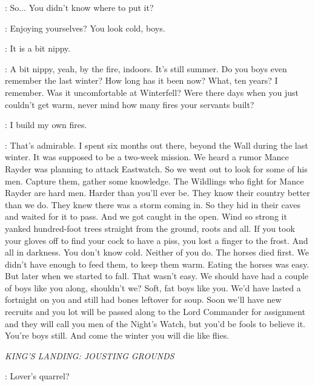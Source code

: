 \SAM: So$\ldots$ You didn't know where to put it? 


\ALLISER: Enjoying yourselves? You look cold, boys. 

\SAM: It is a bit nippy. 

\ALLISER: A bit nippy, yeah, by the fire, indoors. It's still summer. Do you boys even remember the last winter? How long has it been now? What, ten years? I remember. Was it uncomfortable at Winterfell? Were there days when you just couldn't get warm, never mind how many fires your servants built? 

\JON: I build my own fires. 

\ALLISER: That's admirable. I spent six months out there, beyond the Wall during the last winter. It was supposed to be a two-week mission. We heard a rumor Mance Rayder was planning to attack Eastwatch. So we went out to look for some of his men. Capture them, gather some knowledge. The Wildlings who fight for Mance Rayder are hard men. Harder than you'll ever be. They know their country better than we do. They knew there was a storm coming in. So they hid in their caves and waited for it to pass. And we got caught in the open. Wind so strong it yanked hundred-foot trees straight from the ground, roots and all. If you took your gloves off to find your cock to have a piss, you lost a finger to the frost. And all in darkness. You don't know cold. Neither of you do. The horses died first. We didn't have enough to feed them, to keep them warm. Eating the horses was easy. But later when we started to fall. That wasn't easy. We should have had a couple of boys like you along, shouldn't we? Soft, fat boys like you. We'd have lasted a fortnight on you and still had bones leftover for soup. Soon we'll have new recruits and you lot will be passed along to the Lord Commander for assignment and they will call you men of the Night's Watch, but you'd be fools to believe it. You're boys still. And come the winter you will die like flies. 


\scene

\textit{KING'S LANDING: JOUSTING GROUNDS}


\LITTLEFINGER: Lover's quarrel? 

